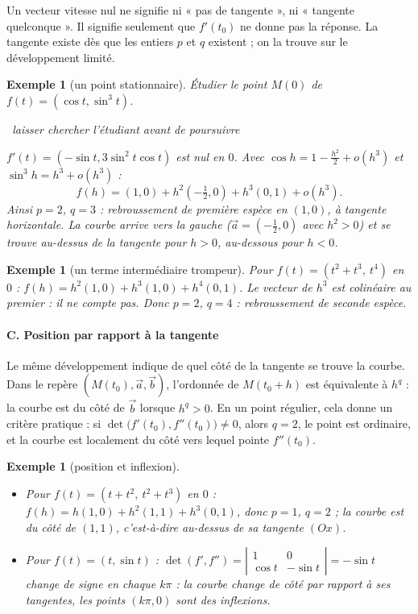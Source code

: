 \documentclass[a4paper,11pt]{article}
\numberwithin{equation}{section}
\numberwithin{figure}{section}
\numberwithin{table}{section}
\theoremstyle{enonce}
\theoremstyle{exemple}
\newtheorem{exemple}[definition]{Exemple}
\theoremstyle{remarque}
\newcommand{\chercher}{\par\smallskip\noindent{\color{Filet}\rule[0.5ex]{1.2cm}{0.4pt}}\
  {\footnotesize\sffamily\itshape\color{Gris}laisser chercher l'étudiant avant de poursuivre}\par\smallskip}
\newcommand{\marge}[1]{\leavevmode\marginpar{\raggedleft\scriptsize\sffamily\color{Gris}\textls[100]{\MakeUppercase{#1}}}\ignorespaces}
\newcommand{\ve}[1]{\vec{#1}}
\newcommand{\dt}[1]{\left|\begin{matrix}#1\end{matrix}\right|}
\begin{document}
\begin{attention}
Un vecteur vitesse nul ne signifie ni « pas de tangente », ni « tangente quelconque ». Il signifie seulement que
$f'(t_0)$ ne donne pas la réponse. La tangente existe dès que les entiers $p$ et $q$ existent ; on la trouve sur le
développement limité.
\end{attention}

\marge{Ensemble}
\begin{exemple}[un point stationnaire]\label{ex:cos-sin3}
Étudier le point $M(0)$ de $f(t)=(\cos t,\sin^3t)$.
\chercher
$f'(t)=(-\sin t,3\sin^2t\cos t)$ est nul en $0$. Avec $\cos h=1-\frac{h^2}2+o(h^3)$ et $\sin^3h=h^3+o(h^3)$ :
\[f(h)=(1,0)+h^2\left(-\tfrac12,0\right)+h^3(0,1)+o(h^3).\]
Ainsi $p=2$, $q=3$ : rebroussement de première espèce en $(1,0)$, à tangente horizontale. La courbe arrive vers la
gauche ($\ve a=(-\frac12,0)$ avec $h^2>0$) et se trouve au-dessus de la tangente pour $h>0$, au-dessous pour $h<0$.
\end{exemple}

\begin{exemple}[un terme intermédiaire trompeur]
Pour $f(t)=(t^2+t^3,\ t^4)$ en $0$ : $f(h)=h^2(1,0)+h^3(1,0)+h^4(0,1)$. Le vecteur de $h^3$ est colinéaire au premier : il
ne compte pas. Donc $p=2$, $q=4$ : rebroussement de seconde espèce.
\end{exemple}

\paragraph{C. Position par rapport à la tangente}
\marge{Expliquer}
Le même développement indique de quel côté de la tangente se trouve la courbe. Dans le repère $(M(t_0),\ve a,\ve b)$,
l'ordonnée de $M(t_0+h)$ est équivalente à $h^q$ : la courbe est du côté de $\ve b$ lorsque $h^q>0$. En un point
régulier, cela donne un critère pratique : si $\det\big(f'(t_0),f''(t_0)\big)\neq0$, alors $q=2$, le point est ordinaire,
et la courbe est localement du côté vers lequel pointe $f''(t_0)$.

\begin{exemple}[position et inflexion]
\begin{itemize}
\item Pour $f(t)=(t+t^2,\ t^2+t^3)$ en $0$ : $f(h)=h(1,0)+h^2(1,1)+h^3(0,1)$, donc $p=1$, $q=2$ ; la courbe est du côté de
      $(1,1)$, c'est-à-dire \emph{au-dessus} de sa tangente $(Ox)$.
\item Pour $f(t)=(t,\sin t)$ : $\det(f',f'')=\dt{1&0\\\cos t&-\sin t}=-\sin t$ change de signe en chaque $k\pi$ : la courbe
      change de côté par rapport à ses tangentes, les points $(k\pi,0)$ sont des inflexions.
\end{itemize}
\end{exemple}
\end{document}
